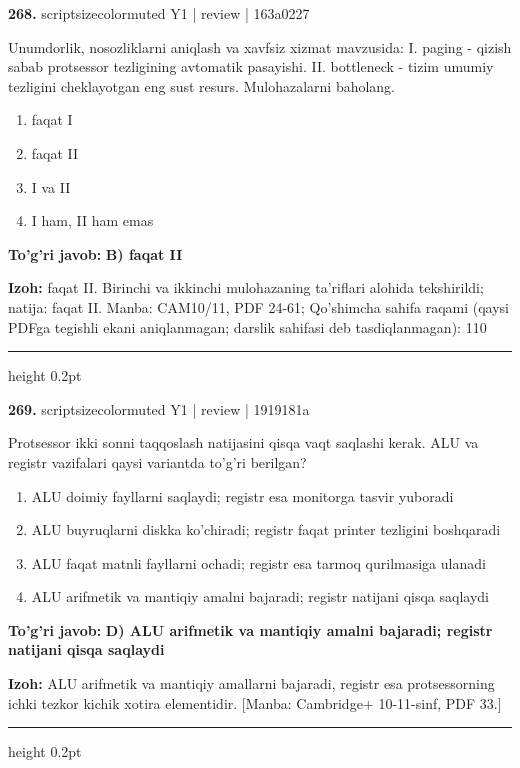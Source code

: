 \documentclass[10pt,a4paper]{article}
\begin{document}
{\bfseries\sffamily\color{ink} 268.} {scriptsizecolor{muted} Y1 | review | 163a0227}
\par
Unumdorlik, nosozliklarni aniqlash va xavfsiz xizmat mavzusida: I. paging - qizish sabab protsessor tezligining avtomatik pasayishi. II. bottleneck - tizim umumiy tezligini cheklayotgan eng sust resurs. Mulohazalarni baholang.
\begin{enumerate}[label=\Alph*),leftmargin=9mm]
\item faqat I
\item faqat II
\item I va II
\item I ham, II ham emas
\end{enumerate}
\begin{tcolorbox}[enhanced,breakable,colback=teal!4,colframe=teal!60!black,boxrule=0.45pt,arc=1.2mm,left=2.7mm,right=2.7mm,top=1.8mm,bottom=1.8mm,before skip=2mm,after skip=2mm]
{\bfseries\sffamily\color{teal}To'g'ri javob:} \textbf{B) faqat II}
\par\smallskip
{\bfseries Izoh:} faqat II. Birinchi va ikkinchi mulohazaning ta'riflari alohida tekshirildi; natija: faqat II. Manba: CAM10/11, PDF 24-61; Qo'shimcha sahifa raqami (qaysi PDFga tegishli ekani aniqlanmagan; darslik sahifasi deb tasdiqlanmagan): 110
\end{tcolorbox}
\vspace{2mm}\hrule height 0.2pt\vspace{3mm}

{\bfseries\sffamily\color{ink} 269.} {scriptsizecolor{muted} Y1 | review | 1919181a}
\par
Protsessor ikki sonni taqqoslash natijasini qisqa vaqt saqlashi kerak. ALU va registr vazifalari qaysi variantda to'g'ri berilgan?
\begin{enumerate}[label=\Alph*),leftmargin=9mm]
\item ALU doimiy fayllarni saqlaydi; registr esa monitorga tasvir yuboradi
\item ALU buyruqlarni diskka ko'chiradi; registr faqat printer tezligini boshqaradi
\item ALU faqat matnli fayllarni ochadi; registr esa tarmoq qurilmasiga ulanadi
\item ALU arifmetik va mantiqiy amalni bajaradi; registr natijani qisqa saqlaydi
\end{enumerate}
\begin{tcolorbox}[enhanced,breakable,colback=teal!4,colframe=teal!60!black,boxrule=0.45pt,arc=1.2mm,left=2.7mm,right=2.7mm,top=1.8mm,bottom=1.8mm,before skip=2mm,after skip=2mm]
{\bfseries\sffamily\color{teal}To'g'ri javob:} \textbf{D) ALU arifmetik va mantiqiy amalni bajaradi; registr natijani qisqa saqlaydi}
\par\smallskip
{\bfseries Izoh:} ALU arifmetik va mantiqiy amallarni bajaradi, registr esa protsessorning ichki tezkor kichik xotira elementidir. [Manba: Cambridge+ 10-11-sinf, PDF 33.]
\end{tcolorbox}
\vspace{2mm}\hrule height 0.2pt\vspace{3mm}
\end{document}
